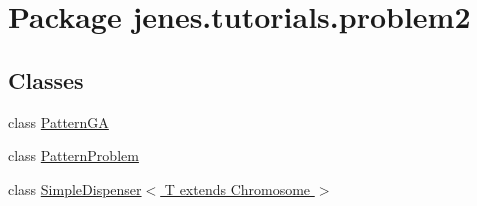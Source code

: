 \hypertarget{namespacejenes_1_1tutorials_1_1problem2}{\section{Package jenes.\-tutorials.\-problem2}
\label{namespacejenes_1_1tutorials_1_1problem2}
}
\subsection*{Classes}
\begin{DoxyCompactItemize}
\item 
class \hyperlink{classjenes_1_1tutorials_1_1problem2_1_1_pattern_g_a}{Pattern\-G\-A}
\item 
class \hyperlink{classjenes_1_1tutorials_1_1problem2_1_1_pattern_problem}{Pattern\-Problem}
\item 
class \hyperlink{classjenes_1_1tutorials_1_1problem2_1_1_simple_dispenser_3_01_t_01extends_01_chromosome_01_4}{Simple\-Dispenser$<$ T extends Chromosome $>$}
\end{DoxyCompactItemize}
